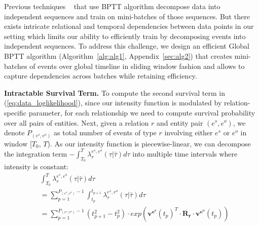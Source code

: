 \documentclass{article}
\begin{document}
Previous techniques ~\citep{DuDaiTriUpaGomSon16,HidKarBalTik16} that use BPTT algorithm decompose data into independent sequences and train on mini-batches of those sequences. But there exists intricate relational and temporal dependencies between data points in our setting which limits our ability to efficiently train by decomposing events into independent sequences. To address this challenge, we design an efficient Global BPTT algorithm (Algorithm~\ref{alg:alg1},  Appendix~\ref{sec:alg2}) that   creates mini-batches of events over global timeline in sliding window fashion and allows to capture dependencies across batches while retaining efficiency.

 
{\bf Intractable Survival Term.} 
To compute the second survival term in (\ref{eq:data_loglikelihood}), since our intensity function is modulated by relation-specific parameter, for each relationship we need to compute survival probability over all pairs of entities. Next, given a relation $r$ and entity pair $(e^s,e^o)$, we denote $P_{(e^s, e^o)}$ as total number of events of type $r$ involving either $e^s$ or $e^o$  in window [$T_0$, $T$). As our intensity function is piecewise-linear, we can decompose the integration term $-\int_{T_0}^T \lambda^{e^s,e^o}_r (\tau | \bar{\tau})d\tau$  into multiple time intervals where intensity is constant:
\vspace{-0.2cm}
\begin{align}
\label{eq:surv}
& \int_{T_0}^T \lambda^{e^s,e^o}_r (\tau | \bar{\tau})d\tau \nonumber \\&=  \sum_{p=1}^{P_{(e^s, e^o)} -1} \int_{t_p}^{t_{p + 1}} \lambda^{e^s,e^o}_r (\tau | \bar{\tau})d\tau \nonumber
\\&= \sum_{p=1}^{P_{(e^s, e^o)} -1}(t^2_{p+1} - t^2_{p}) \cdot exp(\mathbf{v^{e^s}}(t_p)^T\cdot\mathbf{R_r}\cdot\mathbf{v^{e^o}}(t_p))	
\end{align}
\vspace{-0.5cm}
\end{document}
